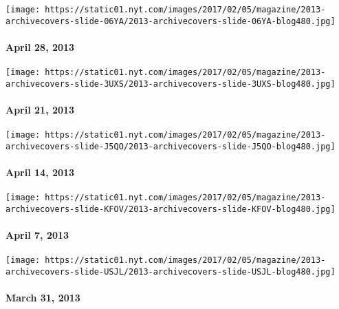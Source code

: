 \href{http://www.nytimes.com/indexes/2013/04/28/magazine/index.html}{}

\texttt{[image: https://static01.nyt.com/images/2017/02/05/magazine/2013-archivecovers-slide-06YA/2013-archivecovers-slide-06YA-blog480.jpg]}

\hypertarget{april-28-2013}{%
\paragraph{April 28, 2013}\label{april-28-2013}}

\href{http://www.nytimes.com/indexes/2013/04/21/magazine/index.html}{}

\texttt{[image: https://static01.nyt.com/images/2017/02/05/magazine/2013-archivecovers-slide-3UXS/2013-archivecovers-slide-3UXS-blog480.jpg]}

\hypertarget{april-21-2013}{%
\paragraph{April 21, 2013}\label{april-21-2013}}

\href{http://www.nytimes.com/indexes/2013/04/14/magazine/index.html}{}

\texttt{[image: https://static01.nyt.com/images/2017/02/05/magazine/2013-archivecovers-slide-J5QO/2013-archivecovers-slide-J5QO-blog480.jpg]}

\hypertarget{april-14-2013}{%
\paragraph{April 14, 2013}\label{april-14-2013}}

\href{http://www.nytimes.com/indexes/2013/04/07/magazine/index.html}{}

\texttt{[image: https://static01.nyt.com/images/2017/02/05/magazine/2013-archivecovers-slide-KFOV/2013-archivecovers-slide-KFOV-blog480.jpg]}

\hypertarget{april-7-2013}{%
\paragraph{April 7, 2013}\label{april-7-2013}}

\href{http://www.nytimes.com/indexes/2013/03/31/magazine/index.html}{}

\texttt{[image: https://static01.nyt.com/images/2017/02/05/magazine/2013-archivecovers-slide-USJL/2013-archivecovers-slide-USJL-blog480.jpg]}

\hypertarget{march-31-2013}{%
\paragraph{March 31, 2013}\label{march-31-2013}}

